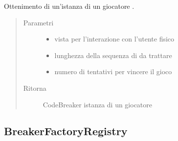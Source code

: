 \documentclass[letterpaper,10pt,italian,openany,oneside]{sphinxmanual}
\begin{document}
\begin{fulllineitems}
\label{\detokenize{source/it/unicam/cs/pa/mastermind/factories/BreakerFactory:it.unicam.cs.pa.mastermind.factories.BreakerFactory.getBreaker(GameView, int, int)}}
Ottenimento di un’istanza di un giocatore .
\begin{quote}\begin{description}
\item[{Parametri}] \leavevmode\begin{itemize}
\item {} 
 \textendash{} vista per l’interazione con l’utente fisico

\item {} 
 \textendash{} lunghezza della sequenza di  da trattare

\item {} 
 \textendash{} numero di tentativi per vincere il gioco

\end{itemize}

\item[{Ritorna}] \leavevmode
CodeBreaker istanza di un giocatore 

\end{description}\end{quote}

\end{fulllineitems}



\subsection{BreakerFactoryRegistry}
\label{\detokenize{source/it/unicam/cs/pa/mastermind/factories/BreakerFactoryRegistry:breakerfactoryregistry}}\label{\detokenize{source/it/unicam/cs/pa/mastermind/factories/BreakerFactoryRegistry::doc}}
\end{document}
